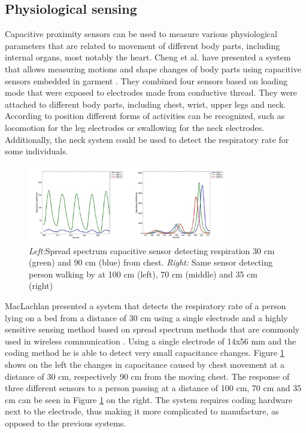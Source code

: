 \subsection{Physiological sensing}
Capacitive proximity sensors can be used to measure various physiological parameters that are related to movement of different body parts, including internal organs, most notably the heart. Cheng et al. have presented a system that allows measuring motions and shape changes of body parts using capacitive sensors embedded in garment \cite{cheng2010active}. They combined four sensors based on loading mode that were exposed to electrodes made from conductive thread. They were attached to different body parts, including chest, wrist, upper legs and neck. According to position different forms of activities can be recognized, such as locomotion for the leg electrodes or swallowing for the neck electrodes. Additionally, the neck system could be used to detect the respiratory rate for some individuals. 

\begin{figure}[ht]
\centering
\includegraphics[width=0.8\textwidth]{images/spread_breath}
\caption{\emph{Left:}Spread spectrum capacitive sensor detecting respiration 30 cm (green) and 90 cm (blue) from chest. \emph{Right:} Same sensor detecting person walking by at 100 cm (left), 70 cm (middle) and 35 cm (right) \cite{MacLachlan2004}}
\label{fig:spread_breath}
\end{figure}

MacLachlan presented a system that detects the respiratory rate of a person lying on a bed from a distance of 30 cm using a single electrode and a highly sensitive sensing method based on spread spectrum methods that are commonly used in wireless communication \cite{MacLachlan2004}. Using a single electrode of 14x56 mm and the coding method he is able to detect very small capacitance changes. Figure \ref{fig:spread_breath} shows on the left the changes in capacitance caused by chest movement at a distance of 30 cm, respectively 90 cm from the moving chest. The response of three different sensors to a person passing at a distance of 100 cm, 70 cm and 35 cm can be seen in Figure \ref{fig:spread_breath} on the right. The system requires coding hardware next to the electrode, thus making it more complicated to manufacture, as opposed to the previous systems.

